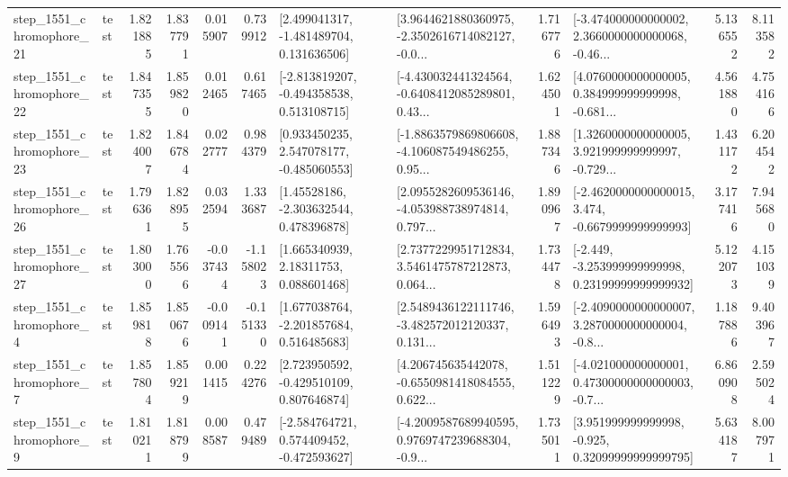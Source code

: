 \begin{tabular}{llrrrrllrlrr}
 step\_1551\_chromophore\_21 &      test &      1.821885 &    1.837791 &      0.015907 &  0.739912 &    [2.499041317, -1.481489704, 0.131636506] &  [3.9644621880360975, -2.3502616714082127, -0.0... &       1.716776 &  [-3.474000000000002, 2.3660000000000068, -0.46... &            5.136552 &          8.113582 \\
 step\_1551\_chromophore\_22 &      test &      1.847355 &    1.859820 &      0.012465 &  0.617465 &   [-2.813819207, -0.494358538, 0.513108715] &  [-4.430032441324564, -0.6408412085289801, 0.43... &       1.624501 &  [4.0760000000000005, 0.384999999999998, -0.681... &            4.561880 &          4.754166 \\
 step\_1551\_chromophore\_23 &      test &      1.824007 &    1.846784 &      0.022777 &  0.984379 &    [0.933450235, 2.547078177, -0.485060553] &  [-1.8863579869806608, -4.106087549486255, 0.95... &       1.887346 &  [1.3260000000000005, 3.921999999999997, -0.729... &            1.431172 &          6.204542 \\
 step\_1551\_chromophore\_26 &      test &      1.796361 &    1.828955 &      0.032594 &  1.333687 &     [1.45528186, -2.303632544, 0.478396878] &  [2.0955282609536146, -4.053988738974814, 0.797... &       1.890967 &  [-2.4620000000000015, 3.474, -0.6679999999999993] &            3.177416 &          7.945680 \\
 step\_1551\_chromophore\_27 &      test &      1.803000 &    1.765566 &     -0.037434 & -1.158023 &      [1.665340939, 2.18311753, 0.088601468] &  [2.7377229951712834, 3.5461475787212873, 0.064... &       1.734478 &  [-2.449, -3.253999999999998, 0.23199999999999932] &            5.122073 &          4.151039 \\
  step\_1551\_chromophore\_4 &      test &      1.859818 &    1.850676 &     -0.009141 & -0.151330 &    [1.677038764, -2.201857684, 0.516485683] &  [2.5489436122111746, -3.482572012120337, 0.131... &       1.596493 &  [-2.4090000000000007, 3.2870000000000004, -0.8... &            1.187886 &          9.403967 \\
  step\_1551\_chromophore\_7 &      test &      1.857804 &    1.859219 &      0.001415 &  0.224276 &    [2.723950592, -0.429510109, 0.807646874] &  [4.206745635442078, -0.6550981418084555, 0.622... &       1.511229 &  [-4.021000000000001, 0.47300000000000003, -0.7... &            6.860908 &          2.595024 \\
  step\_1551\_chromophore\_9 &      test &      1.810211 &    1.818799 &      0.008587 &  0.479489 &   [-2.584764721, 0.574409452, -0.472593627] &  [-4.2009587689940595, 0.9769747239688304, -0.9... &       1.735011 &   [3.951999999999998, -0.925, 0.32099999999999795] &            5.634187 &          8.007971 \\

\end{tabular}
